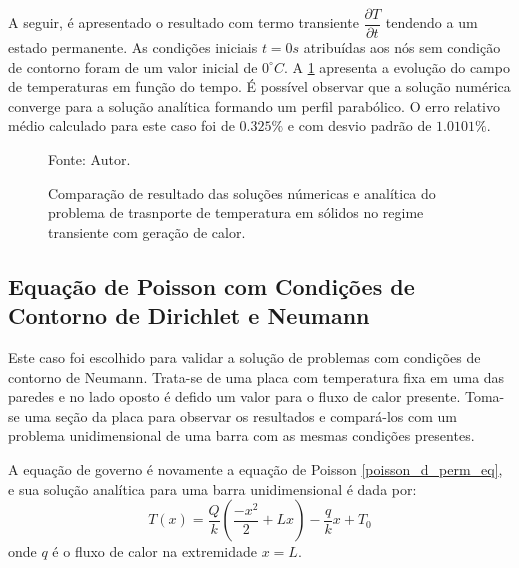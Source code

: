 A seguir, é apresentado o resultado com termo transiente $\dfrac{\partial T}{\partial t}$ tendendo a um estado permanente.
As condições iniciais $t=0s$ atribuídas aos nós sem condição de contorno foram de um valor inicial de $0^{\circ}C$.
A \ref{poisson_d_trans_comp} apresenta a evolução do campo de temperaturas em função do tempo.
É possível observar que a solução numérica converge para a solução analítica formando um perfil parabólico.
O erro relativo médio calculado para este caso foi de $0.325\%$ e com desvio padrão de $1.0101\%$.
\begin{figure}[H]
    \centering
     {\raggedleft \scriptsize Fonte: Autor.}
    \caption{Comparação de resultado das soluções númericas e analítica do problema de trasnporte de temperatura em sólidos no regime transiente com geração de calor.}
    \label{poisson_d_trans_comp}
\end{figure}

\subsection{\textbf{Equação de Poisson com Condições de Contorno de Dirichlet e Neumann}}
\label{sec_poisson_neu}
Este caso foi escolhido para validar a solução de problemas com condições de contorno de Neumann.
Trata-se de uma placa com temperatura fixa em uma das paredes e no lado oposto é defido um valor para o fluxo de calor presente.
Toma-se uma seção da placa para observar os resultados e compará-los com um problema unidimensional de uma barra com as mesmas condições presentes.

A equação de governo é novamente a equação de Poisson \eqref{poisson_d_perm_eq}, e sua solução analítica para uma barra unidimensional é dada por:
\begin{equation}
    T(x) = \dfrac{Q}{k}\left(\dfrac{-x^2}{2} + L x\right) - \dfrac{q}{k} x + T_0
    \label{poisson_n_sol} 
\end{equation}
onde $q$ é o fluxo de calor na extremidade $x=L$.

